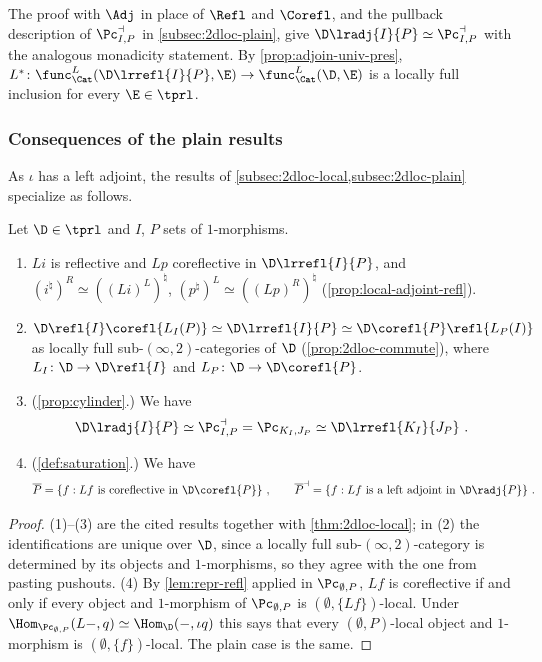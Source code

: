 The proof with $\Adj$ in place of $\Refl$ and $\Corefl$, and the pullback description of $\Pc^{\dashv}_{I,P}$ in \cref{subsec:2dloc-plain}, give $\D\lradj{I}{P} \simeq \Pc^{\dashv}_{I,P}$ with the analogous monadicity statement.
By \cref{prop:adjoin-univ-pres}, $L^{*}\colon \func^{L}_{\Cat}(\D\lrrefl{I}{P},\E) \to \func^{L}_{\Cat}(\D,\E)$ is a locally full inclusion for every $\E \in \tprl$.

\subsubsection*{Consequences of the plain results}
As $\iota$ has a left adjoint, the results of \cref{subsec:2dloc-local,subsec:2dloc-plain} specialize as follows.

\begin{cor}
\label{cor:presentable}
Let $\D \in \tprl$ and $I$, $P$ sets of $1$-morphisms.
\begin{enumerate}
\item $Li$ is reflective and $Lp$ coreflective in $\D\lrrefl{I}{P}$, and $(i^{\natural})^{R} \simeq ((Li)^{L})^{\natural}$, $(p^{\natural})^{L} \simeq ((Lp)^{R})^{\natural}$ (\cref{prop:local-adjoint-refl}).
\item $\D\refl{I}\corefl{L_{I}(P)} \simeq \D\lrrefl{I}{P} \simeq \D\corefl{P}\refl{L_{P}(I)}$ as locally full sub-$(\infty,2)$-categories of $\D$ (\cref{prop:2dloc-commute}), where $L_{I}\colon \D \to \D\refl{I}$ and $L_{P}\colon \D \to \D\corefl{P}$.
\item (\cref{prop:cylinder}.) We have
\[
\D\lradj{I}{P} \simeq \Pc^{\dashv}_{I,P} = \Pc_{K_{I},J_{P}} \simeq \D\lrrefl{K_{I}}{J_{P}} \ .
\]
\item (\cref{def:saturation}.) We have
\[
\overline{P} = \{f : Lf \text{ is coreflective in } \D\corefl{P}\} \ , \qquad \overline{P}^{\dashv} = \{f : Lf \text{ is a left adjoint in } \D\radj{P}\} \ .
\]
\end{enumerate}
\end{cor}

\begin{proof}
(1)--(3) are the cited results together with \cref{thm:2dloc-local}; in (2) the identifications are unique over $\D$, since a locally full sub-$(\infty,2)$-category is determined by its objects and $1$-morphisms, so they agree with the one from pasting pushouts.
(4) By \cref{lem:repr-refl} applied in $\Pc_{\emptyset,P}$, $Lf$ is coreflective if and only if every object and $1$-morphism of $\Pc_{\emptyset,P}$ is $(\emptyset,\{Lf\})$-local. Under $\Hom_{\Pc_{\emptyset,P}}(L-,q) \simeq \Hom_{\D}(-,\iota q)$ this says that every $(\emptyset,P)$-local object and $1$-morphism is $(\emptyset,\{f\})$-local. The plain case is the same.
\end{proof}

